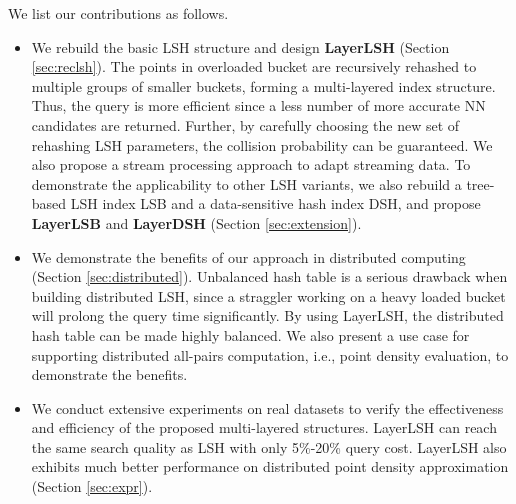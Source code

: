  We list our contributions as follows.
\begin{itemize}
\item We rebuild the basic LSH structure and design \textbf{LayerLSH} (Section \ref{sec:reclsh}). The points in overloaded bucket are recursively rehashed to multiple groups of smaller buckets, forming a multi-layered index structure. Thus, the query is more efficient since a less number of more accurate NN candidates are returned. Further, by carefully choosing the new set of rehashing LSH parameters, the collision probability can be guaranteed. We also propose a stream processing approach to adapt streaming data. To demonstrate the applicability to other LSH variants, we also rebuild a tree-based LSH index LSB and a data-sensitive hash index DSH, and propose \textbf{LayerLSB} and \textbf{LayerDSH} (Section \ref{sec:extension}).
  \item We demonstrate the benefits of our approach in distributed computing (Section \ref{sec:distributed}). Unbalanced hash table is a serious drawback when building distributed LSH, since a straggler working on a heavy loaded bucket will prolong the query time significantly. By using LayerLSH, the distributed hash table can be made highly balanced. We also present a use case for supporting distributed all-pairs computation, i.e., point density evaluation, to demonstrate the benefits.
  \item We conduct extensive experiments on real datasets to verify the effectiveness and efficiency of the proposed multi-layered structures. LayerLSH can reach the same search quality as LSH with only 5\%-20\% query cost. LayerLSH also exhibits much better performance on distributed point density approximation (Section \ref{sec:expr}).
\end{itemize}

